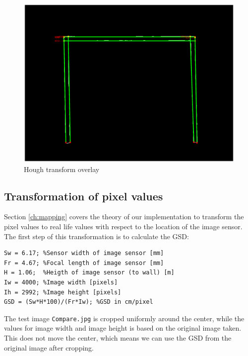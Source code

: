 \begin{figure}[H]
\centering
\includegraphics[width=\textwidth]{fig/lines}
  \caption{Hough transform overlay}
  \label{fig:houghcompare}
\end{figure}

\subsection{Transformation of pixel values}
Section \ref{ch:mapping} covers the theory of our implementation to transform the pixel values to real life values with respect to the location of the image sensor. The first step of this transformation is to calculate the GSD:
\begin{lstlisting}[firstnumber=58]
%Calculate GSD
Sw = 6.17; %Sensor width of image sensor [mm]
Fr = 4.67; %Focal length of image sensor [mm]
H = 1.06;  %Heigth of image sensor (to wall) [m]
Iw = 4000; %Image width [pixels]
Ih = 2992; %Image height [pixels]
GSD = (Sw*H*100)/(Fr*Iw); %GSD in cm/pixel
\end{lstlisting}
The test image \texttt{Compare.jpg} is cropped uniformly around the center, while the values for image width and image height is based on the original image taken. This does not move the center, which means we can use the GSD from the original image after cropping.\\

